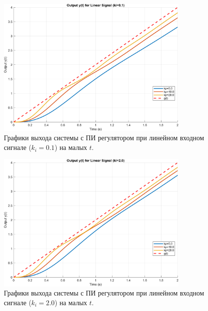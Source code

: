 \begin{figure}[H]
    \centering
    \includegraphics[width=0.85\textwidth]{figs/task_5_output_linear_small_t_ki_0.1.png}
    \caption{Графики выхода системы с ПИ регулятором при линейном входном сигнале (\( k_i = 0.1 \)) на малых $t$.}
    \label{fig:task_5_output_ki_0.1}
\end{figure}

\begin{figure}[H]
    \centering
    \includegraphics[width=0.85\textwidth]{figs/task_5_output_linear_small_t_ki_2.0.png}
    \caption{Графики выхода системы с ПИ регулятором при линейном входном сигнале (\( k_i = 2.0 \)) на малых $t$.}
    \label{fig:task_5_output_ki_2.0}
\end{figure}

